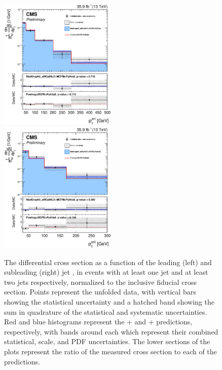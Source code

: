 \begin{figure}[htbp]
  \begin{center}
    \includegraphics[width=0.495\textwidth]{results/unfold_j1Pt.pdf}
    \includegraphics[width=0.495\textwidth]{results/unfold_j2Pt.pdf}
    \caption[Normalized differential {\ZZ} cross sections as functions of leading and subleading jet transverse momentum]{
        The {\ZZ} differential cross section as a function of the leading (left) and subleading (right) jet {\pt}, in {\ZZ} events with at least one jet and at least two jets respectively, normalized to the inclusive fiducial cross section.
        Points represent the unfolded data, with vertical bars showing the statistical uncertainty and a hatched band showing the sum in quadrature of the statistical and systematic uncertainties.
        Red and blue histograms represent the {\POWHEG}+{\MCFM} and {\MGAMC}+{\MCFM} predictions, respectively, with bands around each which represent their combined statistical, scale, and PDF uncertainties.
        The lower sections of the plots represent the ratio of the measured cross section to each of the predictions.
      }\label{fig:unfold_jPt}
  \end{center}
\end{figure}


